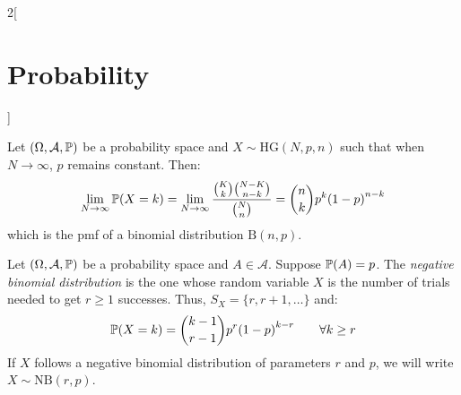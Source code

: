 \documentclass[../../../main_math.tex]{subfiles}
\begin{document}
\begin{multicols}{2}[\section{Probability}]
\begin{definition}
  \end{definition}
  \begin{theorem}
    Let $(\Omega,\mathcal{A},\mathbb{P})$ be a probability space and $X\sim \text{HG}(N,p,n)$ such that when $N\to\infty$, $p$ remains constant. Then:
    $$\lim_{N\to\infty}\mathbb{P}(X=k)=\lim_{N\to\infty}\frac{\binom{K}{k}\binom{N-K}{n-k}}{\binom{N}{n}}=\binom{n}{k}p^k{(1-p)}^{n-k}$$ which is the pmf of a binomial distribution $\text{B}(n,p)$.
  \end{theorem}
  \begin{definition}
    Let $(\Omega,\mathcal{A},\mathbb{P})$ be a probability space and $A\in\mathcal{A}$. Suppose $\mathbb{P}(A)=p$. The \emph{negative binomial distribution} is the one whose random variable $X$ is the number of trials needed to get $r\geq 1$ successes. Thus, $S_X=\{r,r+1,\ldots\}$ and: $$\mathbb{P}(X=k)=\binom{k-1}{r-1}p^r{(1-p)}^{k-r}\qquad \forall k\geq r$$ If $X$ follows a negative binomial distribution of parameters $r$ and $p$, we will write $X\sim \text{NB}(r,p)$.
  \end{definition}

\end{multicols}
\end{document}
